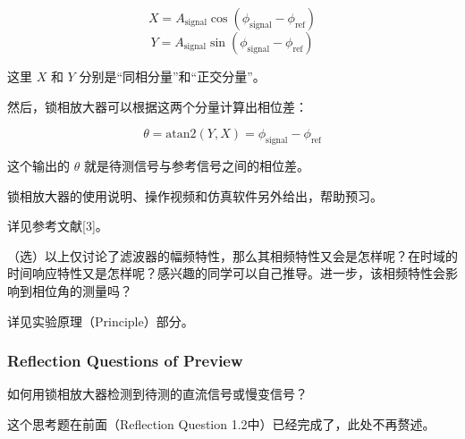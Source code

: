 \[
X = A_{\text{signal}} \cos(\phi_{\text{signal}} - \phi_{\text{ref}})
\]
\[
Y = A_{\text{signal}} \sin(\phi_{\text{signal}} - \phi_{\text{ref}})
\]

这里 \( X \) 和 \( Y \) 分别是“同相分量”和“正交分量”。

然后，锁相放大器可以根据这两个分量计算出相位差：

\[
\theta = \text{atan2}(Y, X) = \phi_{\text{signal}} - \phi_{\text{ref}}
\]

这个输出的 \( \theta \) 就是待测信号与参考信号之间的相位差。

\begin{question}
	锁相放大器的使用说明、操作视频和仿真软件另外给出，帮助预习。
\end{question}
详见参考文献[3]。

\begin{question}
	（选）以上仅讨论了滤波器的幅频特性，那么其相频特性又会是怎样呢？在时域的时间响应特性又是怎样呢？感兴趣的同学可以自己推导。进一步，该相频特性会影响到相位角的测量吗？
\end{question}
详见实验原理（Principle）部分。

\subsubsection{Reflection Questions of Preview}

\begin{question}
	如何用锁相放大器检测到待测的直流信号或慢变信号？
\end{question}
这个思考题在前面（Reflection Question 1.2中）已经完成了，此处不再赘述。

